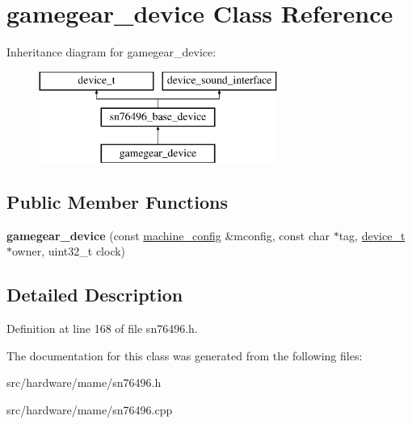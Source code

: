\hypertarget{classgamegear__device}{\section{gamegear\-\_\-device Class Reference}
\label{classgamegear__device}
}
Inheritance diagram for gamegear\-\_\-device\-:\begin{figure}[H]
\begin{center}
\leavevmode
\includegraphics[height=3.000000cm]{classgamegear__device}
\end{center}
\end{figure}
\subsection*{Public Member Functions}
\begin{DoxyCompactItemize}
\item 
\hypertarget{classgamegear__device_a90e2e7ae5bbdc7e6a0ffc56300447b78}{{\bfseries gamegear\-\_\-device} (const \hyperlink{structmachine__config}{machine\-\_\-config} \&mconfig, const char $\ast$tag, \hyperlink{classdevice__t}{device\-\_\-t} $\ast$owner, uint32\-\_\-t clock)}\label{classgamegear__device_a90e2e7ae5bbdc7e6a0ffc56300447b78}

\end{DoxyCompactItemize}


\subsection{Detailed Description}


Definition at line 168 of file sn76496.\-h.



The documentation for this class was generated from the following files\-:\begin{DoxyCompactItemize}
\item 
src/hardware/mame/sn76496.\-h\item 
src/hardware/mame/sn76496.\-cpp\end{DoxyCompactItemize}
